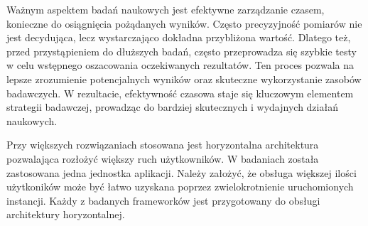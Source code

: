 Ważnym aspektem badań naukowych jest efektywne zarządzanie czasem, konieczne do osiągnięcia pożądanych wyników.
Często precyzyjność pomiarów nie jest decydująca, lecz wystarczająco dokładna przybliżona wartość.
Dlatego też, przed przystąpieniem do dłuższych badań, często przeprowadza się szybkie testy w celu wstępnego oszacowania oczekiwanych rezultatów.
Ten proces pozwala na lepsze zrozumienie potencjalnych wyników oraz skuteczne wykorzystanie zasobów badawczych.
W rezultacie, efektywność czasowa staje się kluczowym elementem strategii badawczej, prowadząc do bardziej skutecznych i wydajnych działań naukowych.

Przy większych rozwiązaniach stosowana jest horyzontalna architektura pozwalająca rozłożyć większy ruch użytkowników.
W badaniach została zastosowana jedna jednostka aplikacji.
Należy założyć, że obsługa większej ilości użytkoników może być łatwo uzyskana poprzez zwielokrotnienie uruchomionych instancji.
Każdy z badanych frameworków jest przygotowany do obsługi architektury horyzontalnej.